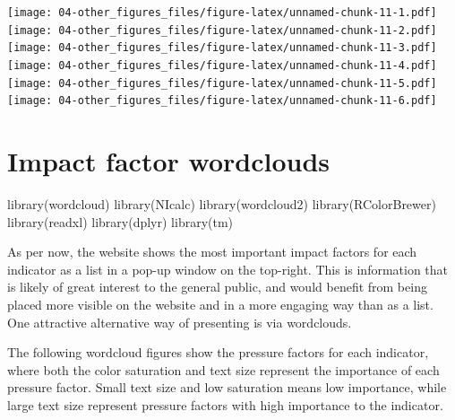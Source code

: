 \documentclass[
]{book}
\newenvironment{Shaded}{\begin{snugshade}}{\end{snugshade}}
\newcommand{\FunctionTok}[1]{\textcolor[rgb]{0.00,0.00,0.00}{#1}}
\newcommand{\NormalTok}[1]{#1}
\begin{document}
\texttt{[image: 04-other\_figures\_files/figure-latex/unnamed-chunk-11-1.pdf]} \texttt{[image: 04-other\_figures\_files/figure-latex/unnamed-chunk-11-2.pdf]} \texttt{[image: 04-other\_figures\_files/figure-latex/unnamed-chunk-11-3.pdf]} \texttt{[image: 04-other\_figures\_files/figure-latex/unnamed-chunk-11-4.pdf]} \texttt{[image: 04-other\_figures\_files/figure-latex/unnamed-chunk-11-5.pdf]} \texttt{[image: 04-other\_figures\_files/figure-latex/unnamed-chunk-11-6.pdf]}

\hypertarget{impact-factor-wordclouds}{%
\section{Impact factor wordclouds}\label{impact-factor-wordclouds}}

\begin{Shaded}
\begin{Highlighting}[]

\FunctionTok{library}\NormalTok{(wordcloud)}
\FunctionTok{library}\NormalTok{(NIcalc)}
\FunctionTok{library}\NormalTok{(wordcloud2)}
\FunctionTok{library}\NormalTok{(RColorBrewer)}
\FunctionTok{library}\NormalTok{(readxl)}
\FunctionTok{library}\NormalTok{(dplyr)}
\FunctionTok{library}\NormalTok{(tm)}
\end{Highlighting}
\end{Shaded}

As per now, the website shows the most important impact factors for each indicator as a list in a pop-up window on the top-right. This is information that is likely of great interest to the general public, and would benefit from being placed more visible on the website and in a more engaging way than as a list. One attractive alternative way of presenting is via wordclouds.

The following wordcloud figures show the pressure factors for each indicator, where both the color saturation and text size represent the importance of each pressure factor. Small text size and low saturation means low importance, while large text size represent pressure factors with high importance to the indicator.
\end{document}
